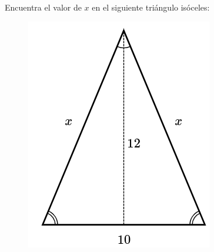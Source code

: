 Encuentra el valor de $x$ en el siguiente triángulo isóceles:

\begin{figure}[H]
    \centering
    \includegraphics[width=0.22\linewidth]{../images/pitagoras11.png}
    \caption{}
    \label{fig:pitagoras11}
\end{figure}
